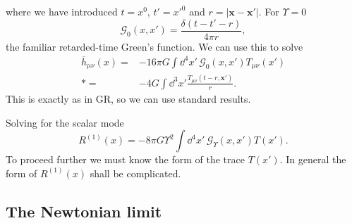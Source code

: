 where we have introduced $t = x^0$, $t' = x'^0$ and $r = |\boldsymbol{x} - \boldsymbol{x'}|$. For $\Upsilon = 0$
\begin{equation}
\mathscr{G}_0(x, x') = \frac{\delta(t - t' - r)}{4 \pi r},
\end{equation}
the familiar retarded-time Green's function. We can use this to solve 
\begin{align}
\overline{h}_{\mu\nu}(x) = {} & -16 \pi G \int \dd^4 x'\, \mathscr{G}_0(x, x') T_{\mu\nu}(x') \nonumber \\*
 = {} & -4 G \int \dd^3 x' \frac{T_{\mu\nu}(t - r, \boldsymbol{x'})}{r}.
\end{align}
This is exactly as in GR, so we can use standard results.

Solving for the scalar mode
\begin{equation}
R^{(1)}(x) = -8 \pi G \Upsilon^2 \int \dd^4 x'\, \mathscr{G}_\Upsilon(x, x') T(x').
\end{equation}
To proceed further we must know the form of the trace $T(x')$. In general the form of $R^{(1)}(x)$ shall be complicated.

\subsection{The Newtonian limit}

